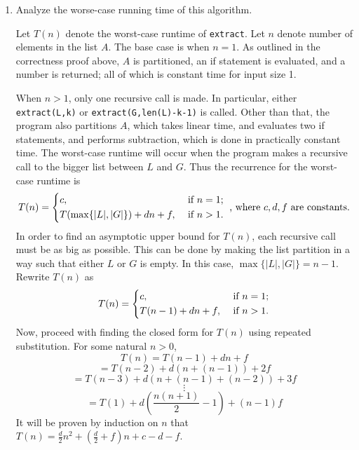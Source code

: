 \documentclass[11pt]{article}
\begin{document}
\begin{enumerate}[label=(\alph*)]
\begin{proof}
            Thus the program returns the correct output for lists of size \(n+1\), and by the principle of complete induction, the program is correct.
            
        \end{proof}
        \item Analyze the worse-case running time of this algorithm.
        
        Let \(T(n)\) denote the worst-case runtime of \verb|extract|. Let \(n\) denote number of elements in the list \(A\). The base case is when \(n=1\). As outlined in the correctness proof above, \(A\) is partitioned, an if statement is evaluated, and a number is returned; all of which is constant time for input size 1.

        When \(n > 1\), only one recursive call is made. In particular, either \verb|extract(L,k)| or \verb|extract(G,len(L)-k-1)| is called. Other than that, the program also partitions \(A\), which takes linear time, and evaluates two if statements, and performs subtraction, which is done in practically constant time. The worst-case runtime will occur when the program makes a recursive call to the bigger list between \(L\) and \(G\). Thus the recurrence for the worst-case runtime is
        \[
            T(n)= \begin{dcases}
                c, &\text{ if } n=1 ;\\
                T(\max \{|L|,|G|\}) + dn + f, &\text{ if } n > 1 .
            \end{dcases}
            \text{ , where } c,d,f \text{ are constants.}
        \]
        In order to find an asymptotic upper bound for \(T(n)\), each recursive call must be as big as possible. This can be done by making the list partition in a way such that either \(L\) or \(G\) is empty. In this case, \(\max \{|L|,|G|\} = n-1\). Rewrite \(T(n)\) as
        \[
            T(n)= \begin{dcases}
                c, &\text{ if } n=1 ;\\
                T(n-1) + dn + f, &\text{ if } n > 1 .
            \end{dcases}
        \]
        Now, proceed with finding the closed form for \(T(n)\) using repeated substitution. For some natural \(n>0\),
        \[
            T(n) = T(n-1) + dn + f
        \]
        \[
            = T(n-2) + d(n + (n-1)) + 2f
        \]
        \[
            = T(n-3) + d(n + (n-1) + (n-2)) + 3f
        \]
        \[
            \vdots
        \]
        \[
            = T(1) + d\left(\frac{n(n+1)}{2} - 1\right) + (n-1)f
        \]
        It will be proven by induction on \(n\) that \(T(n) = \frac{d}{2}n^2 + (\frac{d}{2} + f)n + c-d-f\).


\end{enumerate}
\end{document}
